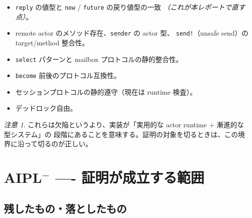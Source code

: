 \documentclass[11pt,a4paper]{ltjsarticle}
\theoremstyle{definition}
\theoremstyle{remark}
\newtheorem{remark}[theorem]{注意}
\begin{document}
\begin{itemize}
\item \verb|reply| の値型と \verb|now| / \verb|future| の戻り値型の一致
      \emph{（これが本レポートで直す点）}。
\item remote actor のメソッド存在、\verb|sender| の actor 型、
      \verb|send!|（unsafe send）の target/method 整合性。
\item \verb|select| パターンと mailbox プロトコルの静的整合性。
\item \verb|become| 前後のプロトコル互換性。
\item セッションプロトコルの静的遵守（現在は runtime 検査）。
\item デッドロック自由。
\end{itemize}

\begin{remark}
これらは欠陥というより、実装が「実用的な actor runtime + 漸進的な型システム」の
段階にあることを意味する。証明の対象を切るときは、この境界に沿って切るのが正しい。
\end{remark}

\section{AIPL$^-$ ---- 証明が成立する範囲}
\label{sec:scope}

\subsection{残したもの・落としたもの}
\end{document}
